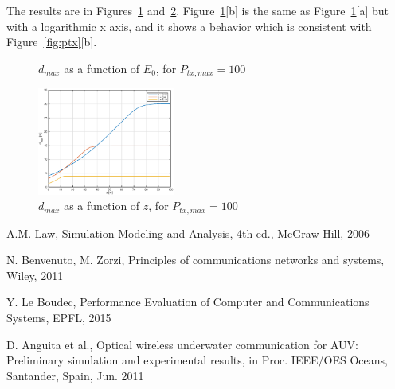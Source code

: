 \documentclass[10pt]{article}
\begin{document}
The results are in Figures~\ref{fig:dmax} and~\ref{fig:dmax_2}. Figure~\ref{fig:dmax}[b] is the same as Figure~\ref{fig:dmax}[a] but with a logarithmic x axis, and it shows a behavior which is consistent with Figure~\ref{fig:ptx}[b].

\begin{figure}[h!]
	\centering
	\caption{$d_{max}$ as a function of $E_0$, for $P_{tx, max} = 100$}
	\label{fig:dmax}
\end{figure}
\begin{figure}[h!]
	\centering
	\includegraphics[width= 0.4\textwidth]{dmax_z}
	\caption{$d_{max}$ as a function of $z$, for $P_{tx, max} = 100$}
	\label{fig:dmax_2}
\end{figure}


\begin{thebibliography}{10}

A.M. Law, Simulation Modeling and Analysis, 4th ed., McGraw Hill, 2006

N. Benvenuto, M. Zorzi, Principles of communications networks and systems, Wiley, 2011

Y. Le Boudec, Performance Evaluation of Computer and Communications Systems, EPFL, 2015

D. Anguita et al., Optical wireless underwater communication for AUV: Preliminary simulation and experimental results, in Proc. IEEE/OES Oceans, Santander, Spain, Jun. 2011

\end{thebibliography}
\end{document}

